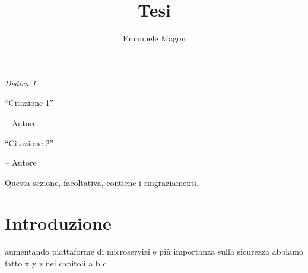 \documentclass[12pt]{report}
\title{Tesi}
\author{Emanuele Magon}
\begin{document}
\makecenteredfrontpage

%
%

{\raggedleft \large \sl Dedica 1\\

    \vspace{2cm}

    ``Citazione 1''

    \bigskip

    \--- Autore\\

    \vspace{2cm}

    ``Citazione 2''

    \bigskip

    \--- Autore\\}

\clearpage
\beforepreface

%
%


%
%

Questa sezione, facoltativa, contiene i ringraziamenti.

%
%

\afterpreface

%
%

\chapter{Introduzione}
\label{cap:introduzione}

aumentando piattaforme di microservizi e più importanza sulla sicurezza abbiamo fatto x y z nei capitoli a b c
\end{document}
